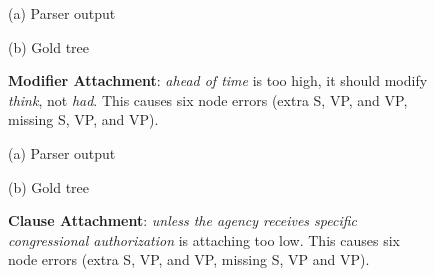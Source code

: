 \begin{figure}
\begin{center}

\small
(a) Parser output

\vspace{3mm}


\small
(b) Gold tree
\end{center}
\derivspace
\caption{
	\label{fig:modifier-attachment}
	\textbf{Modifier Attachment}: \emph{ahead of time} is too high, it should
	modify \emph{think}, not \emph{had}.  This causes six node errors (extra
	S, VP, and VP, missing S, VP, and VP).
}
\derivaftercompress
\end{figure}

\begin{figure}
\begin{center}

\small
(a) Parser output

\vspace{3mm}


\small
(b) Gold tree
\end{center}
\derivspace
\caption{
	\label{fig:clause-attachment}
	\textbf{Clause Attachment}: \emph{unless the agency receives specific
	congressional authorization} is attaching too low. This causes six
	node errors (extra S, VP, and VP, missing S, VP and VP).
}
\derivaftercompress
\end{figure}

